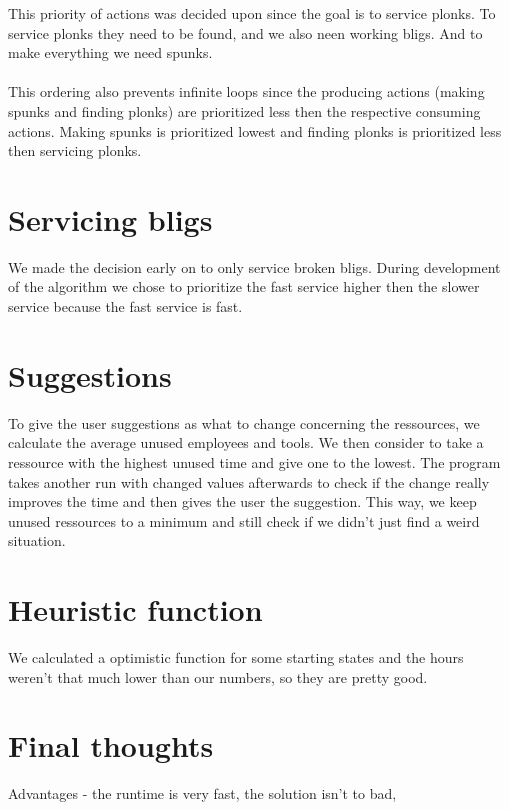\documentclass{article}
\begin{document}
This priority of actions was decided upon since the goal is to service plonks. To service plonks they need to be found, and we also neen working bligs. And to make everything we need spunks. 
\\ \\
This ordering also prevents infinite loops since the producing actions (making spunks and finding plonks) are prioritized less then the respective consuming actions. Making spunks is prioritized lowest and finding plonks is prioritized less then servicing plonks.

\section*{Servicing bligs}
We made the decision early on to only service broken bligs. During development of the algorithm we chose to prioritize the fast service higher then the slower service because the fast service is fast.

\section*{Suggestions}
To give the user suggestions as what to change concerning the ressources, we calculate the average unused employees and tools. We then consider to take a ressource with the highest unused time and give one to the lowest. The program takes another run with changed values afterwards to check if the change really improves the time and then gives the user the suggestion.
This way, we keep unused ressources to a minimum and still check if we didn't just find a weird situation.

\section*{Heuristic function}
We calculated a optimistic function for some starting states and the hours weren't that much lower than our numbers, so they are pretty good.

\section*{Final thoughts}
Advantages - the runtime is very fast, the solution isn't to bad, 
\end{document}
